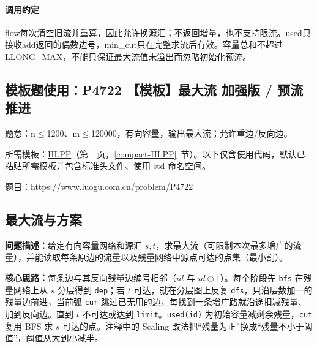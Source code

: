 \paragraph{调用约定} flow每次清空旧流并重算，因此允许换源汇；不返回增量，也不支持限流。used只接收add返回的偶数边号，min\_cut只在完整求流后有效。容量总和不超过LLONG\_MAX，不能只保证最大流值未溢出而忽略初始化预流。

\Needspace{328pt}

\subsection*{模板题使用：P4722 【模板】最大流 加强版 / 预流推进}

\label{usage-example-383}

题意：n$\le$1200、m$\le$120000，有向容量，输出最大流；允许重边/反向边。

所需模板：\hyperref[compact-HLPP]{HLPP}（第~\pageref{compact-HLPP}~页，\ref{compact-HLPP}~节）。以下仅含使用代码，默认已粘贴所需模板并包含标准头文件、使用 std 命名空间。

题目：\url{https://www.luogu.com.cn/problem/P4722}



\subsection{最大流与方案}\label{compact-Dinic}

\noindent\textbf{问题描述：}\allowbreak 给定有向容量网络和源汇 $s,t$，求最大流（可限制本次最多增广的流量），并能读取每条原边的流量以及残量网络中源点可达的点集（最小割）。

\textbf{核心思路：}\allowbreak 每条边与其反向残量边编号相邻（$id$ 与 $id\oplus1$）。每个阶段先 \texttt{bfs} 在残量网络上从 $s$ 分层得到 \texttt{dep}；若 $t$ 可达，就在分层图上反复 \texttt{dfs}，只沿层数加一的残量边前进，当前弧 \texttt{cur} 跳过已无用的边，每找到一条增广路就沿途扣减残量、加到反向边。直到 $t$ 不可达或达到 \texttt{limit}。\texttt{used(id)} 为初始容量减剩余残量，\texttt{cut} 复用 BFS 求 $s$ 可达的点。注释中的 Scaling 改法把“残量为正”换成“残量不小于阈值”，阈值从大到小减半。



